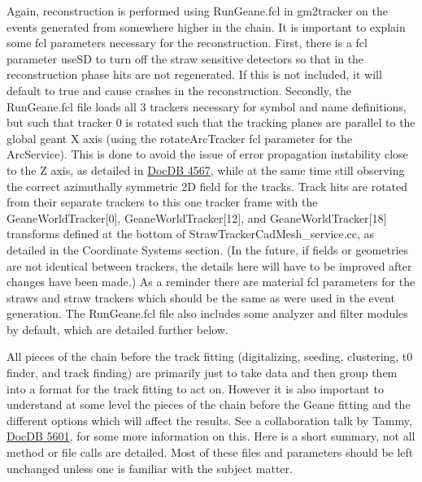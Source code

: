 \documentclass{article}
\begin{document}
    Again, reconstruction is performed using RunGeane.fcl in gm2tracker on the events generated from somewhere higher in the chain. It is important to explain some fcl parameters necessary for the reconstruction. First, there is a fcl parameter useSD to turn off the straw sensitive detectors so that in the reconstruction phase hits are not regenerated. If this is not included, it will default to true and cause crashes in the reconstruction. Secondly, the RunGeane.fcl file loads all 3 trackers necessary for symbol and name definitions, but such that tracker 0 is rotated such that the tracking planes are parallel to the global geant X axis (using the rotateArcTracker fcl parameter for the ArcService). This is done to avoid the issue of error propagation instability close to the Z axis, as detailed in \href{http://gm2-docdb.fnal.gov:8080/cgi-bin/ShowDocument?docid=4567}{DocDB 4567}, while at the same time still observing the correct azimuthally symmetric 2D field for the tracks. Track hits are rotated from their separate trackers to this one tracker frame with the GeaneWorldTracker[0], GeaneWorldTracker[12], and GeaneWorldTracker[18] transforms defined at the bottom of StrawTrackerCadMesh\_service.cc, as detailed in the Coordinate Systems section. (In the future, if fields or geometries are not identical between trackers, the details here will have to be improved after changes have been made.) As a reminder there are material fcl parameters for the straws and straw trackers which should be the same as were used in the event generation. The RunGeane.fcl file also includes some analyzer and filter modules by default, which are detailed further below.

    All pieces of the chain before the track fitting (digitalizing, seeding, clustering, t0 finder, and track finding) are primarily just to take data and then group them into a format for the track fitting to act on. However it is also important to understand at some level the pieces of the chain before the Geane fitting and the different options which will affect the results. See a collaboration talk by Tammy, \href{http://gm2-docdb.fnal.gov:8080/cgi-bin/ShowDocument?docid=5601}{DocDB 5601}, for some more information on this. Here is a short summary, not all method or file calls are detailed. Most of these files and parameters should be left unchanged unless one is familiar with the subject matter. 
\end{document}
